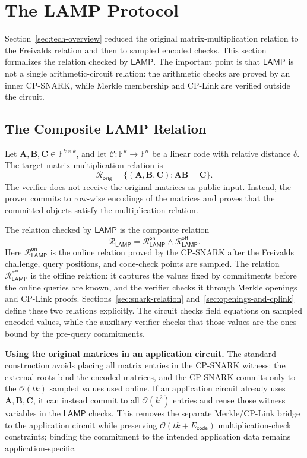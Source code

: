 \documentclass[conference,compsoc]{IEEEtran}
\newcommand{\mat}{\mathbf}          %
\newcommand{\protocol}{\textsf{LAMP}}   %
\theoremstyle{plain}
\theoremstyle{definition}
\theoremstyle{remark}
\providecommand{\DIFaddtex}[1]{{\protect\color{DIFADD} \sf #1}} %
\providecommand{\DIFaddbegin}{} %
\providecommand{\DIFaddend}{} %
\providecommand{\DIFadd}[1]{\texorpdfstring{\DIFaddtex{#1}}{#1}} %
\providecommand{\DIFaddincludegraphics}[2][]{{\color{blue}\fbox{\DIFOincludegraphics[#1]{#2}}}} %
\DeclareRobustCommand{\DIFaddbegin}{\DIFOaddbegin \let\includegraphics\DIFaddincludegraphics} %
\DeclareRobustCommand{\DIFaddend}{\DIFOaddend \let\includegraphics\DIFOincludegraphics} %
\begin{document}
\section{The LAMP Protocol}
\label{sec:construction}

Section~\ref{sec:tech-overview} reduced the original matrix-multiplication
relation to the Freivalds relation and then to sampled encoded checks.  This
section formalizes the relation checked by \(\protocol\).  The important point is
that \(\protocol\) is not a single arithmetic-circuit relation: the arithmetic
checks are proved by an inner CP-SNARK, while Merkle membership and CP-Link are
verified outside the circuit.

\subsection{The Composite LAMP Relation}
\label{sec:relation-chain}

Let \(\mat{A},\mat{B},\mat{C}\in\mathbb{F}^{k\times k}\), and let
\(\mathcal{C}:\mathbb{F}^k\to\mathbb{F}^n\) be a linear code with
relative distance \(\delta\).  The target matrix-multiplication relation is
\[
  \mathcal{R}_{\mathsf{orig}}
  =
  \{(\mat{A},\mat{B},\mat{C}) :
    \mat{A}\mat{B}=\mat{C}\}.
\]
The verifier does not receive the  \DIFaddbegin \DIFadd{original }\DIFaddend matrices as public input.  Instead, the
prover commits to row-wise encodings of the matrices and proves that the
committed objects satisfy the multiplication relation.

The relation checked by \(\protocol\) is the composite relation
\[
  \mathcal{R}_{\mathsf{LAMP}}
  =
  \mathcal{R}_{\mathsf{LAMP}}^{\mathsf{on}}
  \land
  \mathcal{R}_{\mathsf{LAMP}}^{\mathsf{off}} .
\]
Here \(\mathcal{R}_{\mathsf{LAMP}}^{\mathsf{on}}\) is the online relation proved by the CP-SNARK after the Freivalds challenge, query positions, and code-check points are sampled.  The relation \(\mathcal{R}_{\mathsf{LAMP}}^{\mathsf{off}}\) is the offline relation: it captures the values fixed by commitments before the online queries are known, and the verifier checks it through Merkle openings and CP-Link proofs.
Sections~\ref{sec:snark-relation} and~\ref{sec:openings-and-cplink} define
these two relations explicitly.
The circuit checks field equations on sampled encoded values, while the auxiliary verifier checks that those values are the ones bound by the pre-query commitments.

\DIFaddbegin \noindent\DIFadd{\textbf{Using the original matrices in an application circuit.}
The standard construction avoids placing all matrix entries in the CP-SNARK
witness: the external roots bind the encoded matrices, and the CP-SNARK commits
only to the \(\mathcal{O}(tk)\) sampled values used online.  If an application
circuit already uses \(\mat{A},\mat{B},\mat{C}\), it can instead commit to all
\(\mathcal{O}(k^2)\) entries and reuse those witness variables in the
\(\protocol\) checks.  This removes the separate Merkle/CP-Link bridge to the
application circuit while preserving
\(\mathcal{O}(tk+E_{\mathsf{code}})\) multiplication-check constraints; binding
the commitment to the intended application data remains application-specific.
}
\end{document}
